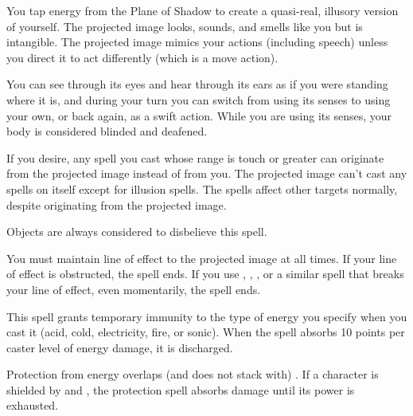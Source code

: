 \spellrng{\rngmed}
\begin{spelleffect}
  You tap energy from the Plane of Shadow to create a quasi-real, illusory version of yourself. The projected image looks, sounds, and smells like you but is intangible. The projected image mimics your actions (including speech) unless you direct it to act differently (which is a move action).
  \par You can see through its eyes and hear through its ears as if you were standing where it is, and during your turn you can switch from using its senses to using your own, or back again, as a swift action. While you are using its senses, your body is considered blinded and deafened.
  \par If you desire, any spell you cast whose range is touch or greater can originate from the projected image instead of from you. The projected image can't cast any spells on itself except for illusion spells. The spells affect other targets normally, despite originating from the projected image.
\end{spelleffect}
\begin{spellnotes}
    Objects are always considered to disbelieve this spell.
  \par You must maintain line of effect to the projected image at all times. If your line of effect is obstructed, the spell ends. If you use , , , or a similar spell that breaks your line of effect, even momentarily, the spell ends.
\end{spellnotes}

\begin{spelleffect}
  This spell grants temporary immunity to the type of energy you specify when you cast it (acid, cold, electricity, fire, or sonic). When the spell absorbs 10 points per caster level of energy damage, it is discharged.
\end{spelleffect}
\begin{spellnotes}
  Protection from energy overlaps (and does not stack with) . If a character is shielded by  and , the protection spell absorbs damage until its power is exhausted.
\end{spellnotes}

